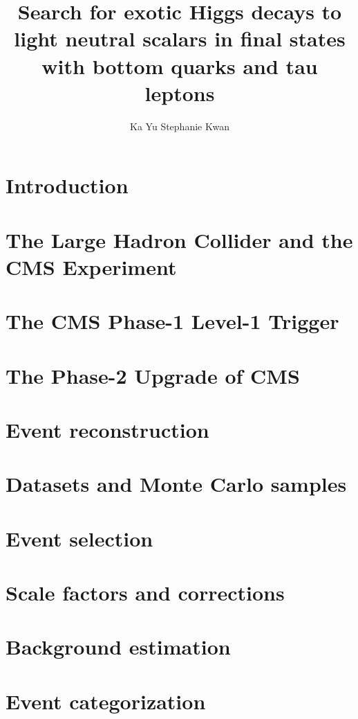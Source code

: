 \documentclass[12pt,lot,lof]{puthesis}
\title{Search for exotic Higgs decays to light neutral scalars in final states with bottom quarks and tau leptons}
\author{Ka Yu Stephanie Kwan}
\begin{document}
 
\chapter{Introduction}


\chapter{The Large Hadron Collider and the CMS Experiment}


\chapter{The CMS Phase-1 Level-1 Trigger}


\chapter{The Phase-2 Upgrade of CMS}
\label{chapter:phase-2-upgrade-cms}


\chapter{Event reconstruction}


\chapter{Datasets and Monte Carlo samples}


\chapter{Event selection}


\chapter{Scale factors and corrections}
\label{chapter:ch-8:scale-factors-and-corrections}


\chapter{Background estimation}


\chapter{Event categorization}
\label{chapter:ch-10:event-categorization}

\end{document}
